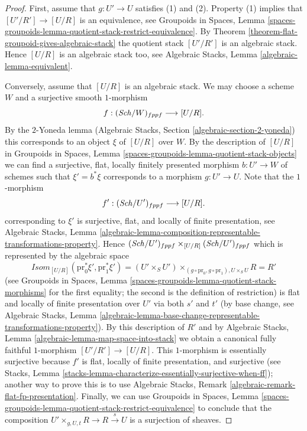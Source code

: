 \begin{proof}
First, assume that $g : U' \to U$ satisfies (1) and (2). Property (1)
implies that $[U'/R'] \to [U/R]$ is an equivalence, see
Groupoids in Spaces,
Lemma \ref{spaces-groupoids-lemma-quotient-stack-restrict-equivalence}.
By
Theorem \ref{theorem-flat-groupoid-gives-algebraic-stack}
the quotient stack $[U'/R']$ is an algebraic stack. Hence
$[U/R]$ is an algebraic stack too, see
Algebraic Stacks, Lemma \ref{algebraic-lemma-equivalent}.

\medskip\noindent
Conversely, assume that $[U/R]$ is an algebraic stack. We may choose a
scheme $W$ and a surjective smooth $1$-morphism
$$
f : (\mathit{Sch}/W)_{fppf} \longrightarrow [U/R].
$$
By the $2$-Yoneda lemma
(Algebraic Stacks, Section \ref{algebraic-section-2-yoneda})
this corresponds to an object $\xi$ of $[U/R]$ over $W$.
By the description of $[U/R]$ in
Groupoids in Spaces, Lemma \ref{spaces-groupoids-lemma-quotient-stack-objects}
we can find a surjective, flat, locally finitely presented morphism
$b : U' \to W$ of schemes such that $\xi' = b^*\xi$ corresponds to a morphism
$g : U' \to U$. Note that the $1$-morphism
$$
f' : (\mathit{Sch}/U')_{fppf} \longrightarrow [U/R].
$$
corresponding to $\xi'$ is surjective, flat, and locally of finite
presentation, see
Algebraic Stacks, Lemma
\ref{algebraic-lemma-composition-representable-transformations-property}.
Hence
$(\mathit{Sch}/U')_{fppf} \times_{[U/R]} (\mathit{Sch}/U')_{fppf}$
which is represented by the algebraic space
$$
\mathit{Isom}_{[U/R]}(\text{pr}_0^*\xi', \text{pr}_1^*\xi') =
(U' \times_S U')
\times_{(g \circ \text{pr}_0, g \circ \text{pr}_1), U \times_S U} R = R'
$$
(see
Groupoids in Spaces, Lemma
\ref{spaces-groupoids-lemma-quotient-stack-morphisms}
for the first equality; the second is the definition of restriction)
is flat and locally of finite presentation over $U'$ via both $s'$ and $t'$
(by base change, see
Algebraic Stacks, Lemma
\ref{algebraic-lemma-base-change-representable-transformations-property}).
By this description of $R'$ and by
Algebraic Stacks, Lemma \ref{algebraic-lemma-map-space-into-stack}
we obtain a canonical fully faithful $1$-morphism $[U'/R'] \to [U/R]$.
This $1$-morphism is essentially surjective because $f'$ is flat,
locally of finite presentation, and surjective (see
Stacks, Lemma \ref{stacks-lemma-characterize-essentially-surjective-when-ff});
another way to prove this is to use
Algebraic Stacks, Remark
\ref{algebraic-remark-flat-fp-presentation}.
Finally, we can use
Groupoids in Spaces, Lemma
\ref{spaces-groupoids-lemma-quotient-stack-restrict-equivalence}
to conclude that the composition
$U' \times_{g, U, t} R \to R \xrightarrow{s} U$ is a surjection of sheaves.
\end{proof}

